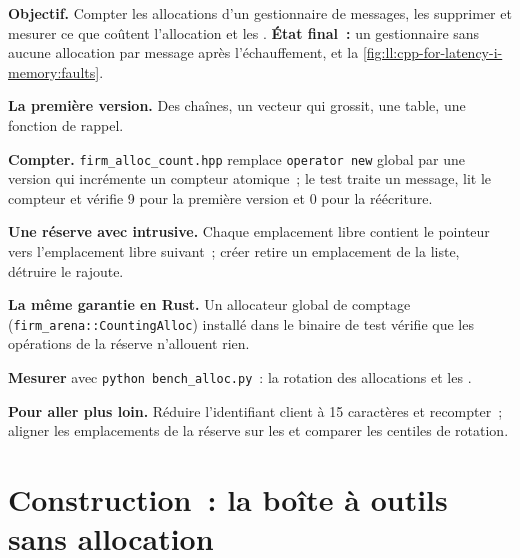 \begin{tutorial}
\textbf{Objectif.} Compter les allocations d'un gestionnaire de messages, les supprimer et mesurer ce que coûtent l'allocation et les .
\textbf{État final~:} un gestionnaire sans aucune allocation par message après l'échauffement, et
la \cref{fig:ll:cpp-for-latency-i-memory:faults}.
\begin{tutsteps}
\item \textbf{La première version.} Des chaînes, un vecteur qui grossit, une table, une fonction de rappel.
\label{lst:ll:cpp-for-latency-i-memory:naive}
\item \textbf{Compter.} \texttt{firm\_alloc\_count.hpp} remplace \texttt{operator new} global par une version qui incrémente un
compteur atomique~; le test traite un message, lit le compteur et vérifie 9 pour la première version et 0 pour la réécriture.
\item \textbf{Une réserve avec  intrusive.} Chaque emplacement libre contient le pointeur vers l'emplacement libre suivant~; créer
retire un emplacement de la liste, détruire le rajoute.
\label{lst:ll:cpp-for-latency-i-memory:pool}
\item \textbf{La même garantie en Rust.} Un allocateur global de comptage (\texttt{firm\_arena::CountingAlloc}) installé
dans le binaire de test vérifie que les opérations de la réserve n'allouent rien.
\item \textbf{Mesurer} avec \texttt{python bench\_alloc.py}~: la rotation des allocations et les .
\end{tutsteps}
\textbf{Pour aller plus loin.} Réduire l'identifiant client à 15 caractères et recompter~; aligner les emplacements de la réserve
sur les  et comparer les centiles de rotation.
\end{tutorial}

\section{Construction~: la boîte à outils sans allocation}\label{bld:ll:cpp-for-latency-i-memory:arena}

